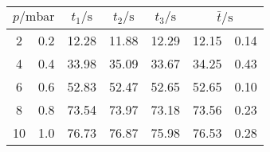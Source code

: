 \label{tab:tabDL2}
	\begin{tabular}{S[table-format=2.0] @{${}\pm{}$} S[table-format=1.1]S[table-format=2.2]S[table-format=2.2]S[table-format=2.2]S[table-format=2.2] @{${}\pm{}$} S[table-format=1.2]}
		\toprule
		 & {$t_1/\si{\second}$} & {$t_2/\si{\second}$} & {$t_3/\si{\second}$} &  \\
		 & 0.2 & 12.28 & 11.88 & 12.29 & 12.15 & 0.14 \\
		 4 & 0.4 & 33.98 & 35.09 & 33.67 & 34.25 & 0.43 \\
		 6 & 0.6 & 52.83 & 52.47 & 52.65 & 52.65 & 0.10 \\
		 8 & 0.8 & 73.54 & 73.97 & 73.18 & 73.56 & 0.23 \\
		10 & 1.0 & 76.73 & 76.87 & 75.98 & 76.53 & 0.28 \\
		\bottomrule
	\end{tabular}
